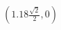 \documentclass[preview]{standalone}
\begin{document}
\begin{align*}
(1.18 \frac{ \sqrt{2} }{2}, 0)
\end{align*}
\end{document}
